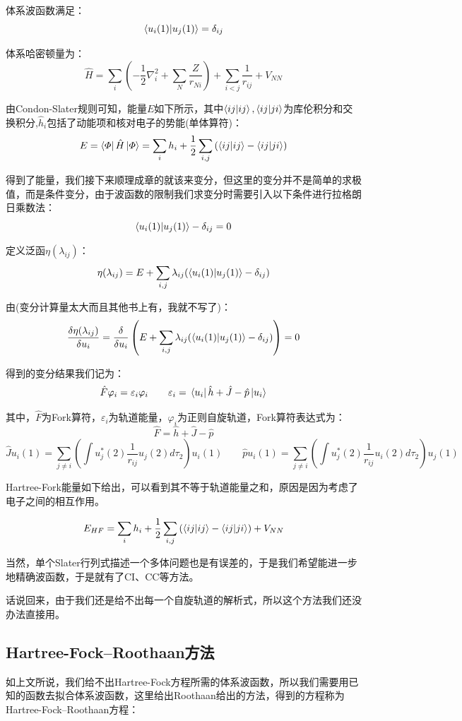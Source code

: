 体系波函数满足：
\[\bra{u_i(1)}\ket{u_j(1)}=\delta_{ij}\]

体系哈密顿量为：
\[\hat{H}=\sum_i\left(-\frac{1}{2}\nabla^2_i+\sum_N\frac{Z}{r_{Ni}}\right)+\sum_{i<j}\frac{1}{r_{ij}}+V_{NN}\]

由Condon-Slater规则可知，能量$E$如下所示，其中$\bra{ij}\ket{ij},\bra{ij}\ket{ji}$为库伦积分和交换积分,$\hat{h}_i$包括了动能项和核对电子的势能(单体算符)：
\[E=\bra{\varPhi}\hat{H}\ket{\varPhi}=\sum_ih_i+\frac{1}{2}\sum_{i,j}\left(\bra{ij}\ket{ij}-\bra{ij}\ket{ji}\right)\]

得到了能量，我们接下来顺理成章的就该来变分，但这里的变分并不是简单的求极值，而是条件变分，由于波函数的限制我们求变分时需要引入以下条件进行拉格朗日乘数法：
\[\bra{u_i(1)}\ket{u_j(1)}-\delta_{ij}=0\]

定义泛函$\eta(\lambda_{ij})$：
\[\eta(\lambda_{ij})=E+\sum_{i,j}\lambda_{ij}(\bra{u_i(1)}\ket{u_j(1)}-\delta_{ij})\]

由(变分计算量太大而且其他书上有，我就不写了)：
\[\frac{\delta\eta(\lambda_{ij})}{\delta u_i}=\frac{\delta}{\delta u_i}\left(E+\sum_{i,j}\lambda_{ij}(\bra{u_i(1)}\ket{u_j(1)}-\delta_{ij})\right)=0\]

得到的变分结果我们记为：
\[\hat{F}\varphi_i=\varepsilon_i\varphi_i \qquad \varepsilon_i=\bra*{u_i}\hat{h} + \hat{J} - \hat{p}\ket*{u_i}\]

其中，$\hat{F}$为Fork算符，$\varepsilon_i$为轨道能量，$\varphi_i$为正则自旋轨道，Fork算符表达式为：
\[\hat{F} = \hat{h} + \hat{J} - \hat{p}\]
\[\hat{J}u_i(1) = \sum_{j \neq i}\left(\int u_j^*(2)\frac{1}{r_{ij}}u_j(2)d\tau_2\right)u_i(1) \qquad \hat{p}u_i(1) = \sum_{j \neq i}\left(\int u_j^*(2)\frac{1}{r_{ij}}u_i(2)d\tau_2\right)u_j(1)\]

Hartree-Fork能量如下给出，可以看到其不等于轨道能量之和，原因是因为考虑了电子之间的相互作用。

\[E_{HF}=\sum_ih_i+\frac{1}{2}\sum_{i,j}\left(\bra{ij}\ket{ij}-\bra{ij}\ket{ji}\right)+V_{NN}\]

当然，单个Slater行列式描述一个多体问题也是有误差的，于是我们希望能进一步地精确波函数，于是就有了CI、CC等方法。

话说回来，由于我们还是给不出每一个自旋轨道的解析式，所以这个方法我们还没办法直接用。

\subsection{Hartree-Fock–Roothaan方法}
如上文所说，我们给不出Hartree-Fock方程所需的体系波函数，所以我们需要用已知的函数去拟合体系波函数，这里给出Roothaan给出的方法，得到的方程称为Hartree-Fock–Roothaan方程：

